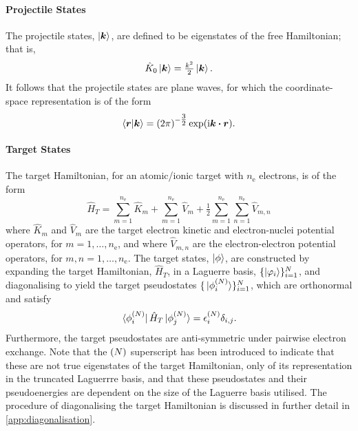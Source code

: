 \documentclass[draft]{article}
\begin{document}
\paragraph{Projectile States}

The projectile states, $\ket{\boldsymbol{k}}$, are defined to be eigenstates of
the free Hamiltonian; that is,
\begin{equation}
  \label{eq:projectile-hamiltonian}
  \hat{K}_{0}
  \ket{\boldsymbol{k}}
  =
  \tfrac{k^{2}}{2}
  \ket{\boldsymbol{k}}
  .
\end{equation}
It follows that the projectile states are plane waves, for which the
coordinate-space representation is of the form
\begin{equation}
  \label{eq:projectile-states}
  \bra{\boldsymbol{r}}
  \ket{\boldsymbol{k}}
  =
  \lr{2 \pi}^{-\tfrac{3}{2}}
  \exponential\lr
  {
    \imath
    \boldsymbol{k}
    \vdot
    \boldsymbol{r}
  }
  .
\end{equation}

\paragraph{Target States}

The target Hamiltonian, for an atomic/ionic target with $n_{\mathrm{e}}$
electrons, is of the form
\begin{equation}
  \label{eq:target-hamiltonian}
  \hat{H}_{T}
  =
  \sum_{m = 1}^{n_{\mathrm{e}}}
  \hat{K}_{m}
  +
  \sum_{m = 1}^{n_{\mathrm{e}}}
  \hat{V}_{m}
  +
  \tfrac{1}{2}
  \sum_{m = 1}^{n_{\mathrm{e}}}
  \sum_{n = 1}^{n_{\mathrm{e}}}
  \hat{V}_{m, n}
\end{equation}
where $\hat{K}_{m}$ and $\hat{V}_{m}$ are the target electron kinetic and
electron-nuclei potential operators, for $m = 1, \dotsc, n_{\mathrm{e}}$, and
where $\hat{V}_{m, n}$ are the electron-electron potential operators, for
$m, n = 1, \dotsc, n_{\mathrm{e}}$.
The target states, $\ket{\phi}$, are constructed by expanding the target
Hamiltonian, $\hat{H}_{T}$, in a Laguerre basis,
$\lbrace\ket{\varphi_{i}}\rbrace_{i = 1}^{N}$, and diagonalising to yield the target
pseudostates $\lbrace\ket*{\phi_{i}^{(N)}}\rbrace_{i = 1}^{N}$, which are
orthonormal and satisfy
\begin{equation}
  \label{eq:target-states}
  \bra*{\phi_{i}^{(N)}}
  \hat{H}_{T}
  \ket*{\phi_{j}^{(N)}}
  =
  \epsilon_{i}^{(N)}
  \delta_{i, j}
  .
\end{equation}
Furthermore, the target pseudostates are anti-symmetric under pairwise electron
exchange.
Note that the $(N)$ superscript has been introduced to indicate that these
are not true eigenstates of the target Hamiltonian, only of its representation
in the truncated Laguerrre basis, and that these pseudostates and their
pseudoenergies are dependent on the size of the Laguerre basis utilised.
The procedure of diagonalising the target Hamiltonian is discussed in further
detail in \autoref{app:diagonalisation}.
\end{document}
